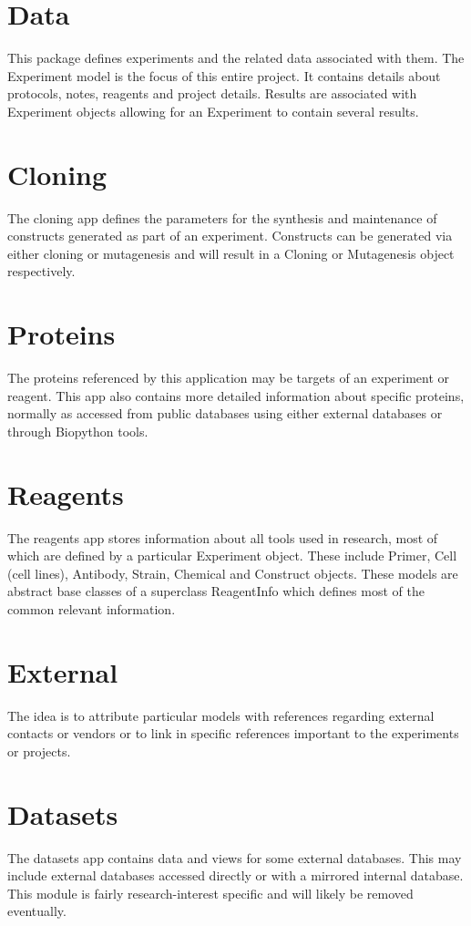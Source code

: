 \documentclass[letterpaper,10pt,english]{sphinxmanual}
\begin{document}
\section{Data}
\label{api:data}
This package defines experiments and the related data associated with them. The Experiment model is the focus of this entire project. It contains details about protocols, notes, reagents and project details. Results are associated with Experiment objects allowing for an Experiment to contain several results.


\section{Cloning}
\label{api:cloning}
The cloning app defines the parameters for the synthesis and maintenance of constructs generated as part of an experiment.  Constructs can be generated via either cloning or mutagenesis and will result in a Cloning or Mutagenesis object respectively.


\section{Proteins}
\label{api:proteins}
The proteins referenced by this application may be targets of an experiment or reagent.  This app also contains more detailed information about specific proteins, normally as accessed from public databases using either external databases or through Biopython tools.


\section{Reagents}
\label{api:reagents}
The reagents app stores information about all tools used in research, most of which are defined by a particular Experiment object.  These include Primer, Cell (cell lines), Antibody, Strain, Chemical and Construct objects.  These models are abstract base classes of a superclass ReagentInfo which defines most of the common relevant information.


\section{External}
\label{api:external}
The idea is to attribute particular models with references regarding external contacts or vendors or to link in specific references important to the experiments or projects.


\section{Datasets}
\label{api:datasets}
The datasets app contains data and views for some external databases.  This may include external databases accessed directly or with a mirrored internal database.  This module is fairly research-interest specific and will likely be removed eventually.
\end{document}
